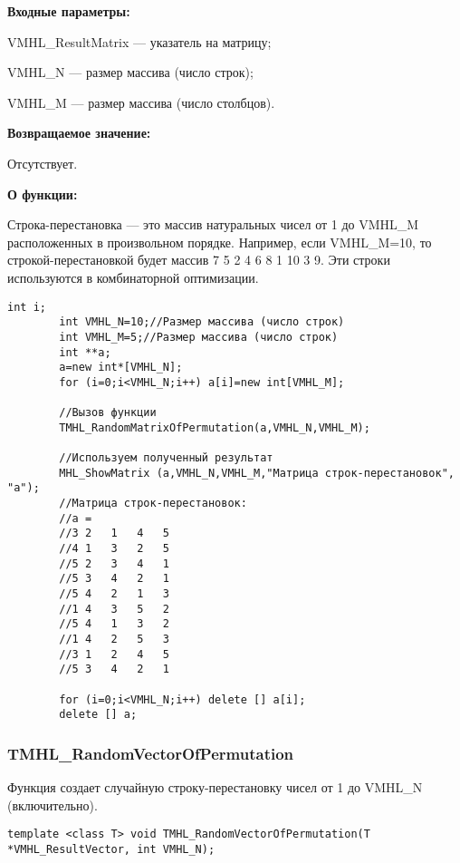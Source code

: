 \documentclass[a4paper,12pt]{article}
\begin{document}
\textbf{Входные параметры:}
 
 VMHL\_ResultMatrix --- указатель на матрицу;
 
 VMHL\_N --- размер массива (число строк);
 
 VMHL\_M --- размер массива (число столбцов).

\textbf{Возвращаемое значение:} 

Отсутствует.

\textbf{О функции:}

Строка-перестановка --- это массив натуральных чисел от 1 до VMHL\_M расположенных в произвольном порядке. Например, если VMHL\_M=10, то строкой-перестановкой будет массив 7 5 2 4 6 8 1 10 3 9. Эти строки используются в комбинаторной оптимизации.



\begin{lstlisting}[label=code_use_TMHL_RandomMatrixOfPermutation,caption=Пример использования]
        int i;
        int VMHL_N=10;//Размер массива (число строк)
        int VMHL_M=5;//Размер массива (число строк)
        int **a;
        a=new int*[VMHL_N];
        for (i=0;i<VMHL_N;i++) a[i]=new int[VMHL_M];

        //Вызов функции
        TMHL_RandomMatrixOfPermutation(a,VMHL_N,VMHL_M);

        //Используем полученный результат
        MHL_ShowMatrix (a,VMHL_N,VMHL_M,"Матрица строк-перестановок", "a");
        //Матрица строк-перестановок:
        //a =
        //3	2	1	4	5
        //4	1	3	2	5
        //5	2	3	4	1
        //5	3	4	2	1
        //5	4	2	1	3
        //1	4	3	5	2
        //5	4	1	3	2
        //1	4	2	5	3
        //3	1	2	4	5
        //5	3	4	2	1

        for (i=0;i<VMHL_N;i++) delete [] a[i];
        delete [] a;
\end{lstlisting}

\subsubsection{TMHL\_RandomVectorOfPermutation}\label{TMHL_RandomVectorOfPermutation}

Функция создает случайную строку-перестановку чисел от 1 до VMHL\_N (включительно).


\begin{lstlisting}[label=code_syntax_TMHL_RandomVectorOfPermutation,caption=Синтаксис]
template <class T> void TMHL_RandomVectorOfPermutation(T *VMHL_ResultVector, int VMHL_N);
\end{lstlisting}
\end{document}
